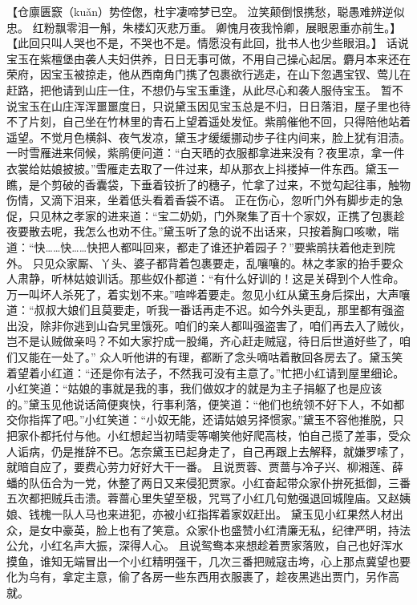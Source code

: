 \documentclass[12pt,oneside]{book}
\begin{document}
【仓廪匮窾（kuǎn）势倥偬，杜宇凄啼梦已空。
泣笑颠倒恨携愁，聪愚难辨逆似忠。
红粉飘零泪一斛，朱楼幻灭悲万重。
卿愧月夜我怜卿，展眼恩重亦前生。】
【此回只叫人哭也不是，不哭也不是。情愿没有此回，批书人也少些眼泪。】
话说宝玉在紫檀堡由袭人夫妇供养，日日无事可做，不用自己操心起居。麝月本来还在荣府，因宝玉被掠走，他从西南角门携了包裹欲行逃走，在山下忽遇宝钗、莺儿在赶路，把他请到山庄一住，不想仍与宝玉重逢，从此尽心和袭人服侍宝玉。
暂不说宝玉在山庄浑浑噩噩度日，只说黛玉因见宝玉总是不归，日日落泪，屋子里也待不了片刻，自己坐在竹林里的青石上望着遥处发怔。紫鹃催他不回，只得陪他站着遥望。不觉月色横斜、夜气发凉，黛玉才缓缓挪动步子往内间来，脸上犹有泪渍。
一时雪雁进来伺候，紫鹃便问道：“白天晒的衣服都拿进来没有？夜里凉，拿一件衣裳给姑娘披披。”雪雁走去取了一件过来，却从那衣上抖搂掉一件东西。黛玉一瞧，是个剪破的香囊袋，下垂着铰折了的穗子，忙拿了过来，不觉勾起往事，触物伤情，又滴下泪来，坐着低头看着香袋不语。
正在伤心，忽听门外有脚步走的急促，只见林之孝家的进来道：“宝二奶奶，门外聚集了百十个家奴，正携了包裹趁夜要散去呢，我怎么也劝不住。”黛玉听了急的说不出话来，只按着胸口咳嗽，喘道：“快……快……快把人都叫回来，都走了谁还护着园子？”要紫鹃扶着他走到院外。
只见众家厮、丫头、婆子都背着包裹要走，乱嚷嚷的。林之孝家的抬手要众人肃静，听林姑娘训话。那些奴仆都道：“有什么好训的！这是关碍到个人性命。万一叫坏人杀死了，着实划不来。”喧哗着要走。忽见小红从黛玉身后探出，大声嚷道：“叔叔大娘们且莫要走，听我一番话再走不迟。如今外头更乱，那里都有强盗出没，除非你逃到山旮旯里饿死。咱们的亲人都叫强盗害了，咱们再去入了贼伙，岂不是认贼做亲吗？不如大家拧成一股绳，齐心赶走贼寇，待日后世道好些了，咱们又能在一处了。”
众人听他讲的有理，都断了念头嘀咕着散回各房去了。黛玉笑着望着小红道：“还是你有法子，不然我可没有主意了。”忙把小红请到屋里细论。小红笑道：“姑娘的事就是我的事，我们做奴才的就是为主子捐躯了也是应该的。”黛玉见他说话简便爽快，行事利落，便笑道：“他们也统领不好下人，不如都交你指挥了吧。”小红笑道：“小奴无能，还请姑娘另择惯家。”黛玉不容他推脱，只把家仆都托付与他。小红想起当初晴雯等嘲笑他好爬高枝，怕自己揽了差事，受众人诟病，仍是推辞不已。怎奈黛玉已起身走了，自己再跟上去解释，就嫌罗嗦了，就暗自应了，要费心劳力好好大干一番。
且说贾蓉、贾蔷与冷子兴、柳湘莲、薛蟠的队伍合为一党，休整了两日又来侵犯贾家。小红奋起带众家仆拚死抵御，三番五次都把贼兵击溃。蓉蔷心里失望至极，咒骂了小红几句勉强退回城隍庙。又赵姨娘、钱槐一队人马也来进犯，亦被小红指挥着家奴赶出。
黛玉见小红果然人材出众，是女中豪英，脸上也有了笑意。众家仆也盛赞小红清廉无私，纪律严明，持法公允，小红名声大振，深得人心。
且说鸳鸯本来想趁着贾家落败，自己也好浑水摸鱼，谁知无端冒出一个小红精明强干，几次三番把贼寇击垮，心上那点冀望也要化为乌有，拿定主意，偷了各房一些东西用衣服裹了，趁夜黑逃出贾门，另作高就。
\end{document}
